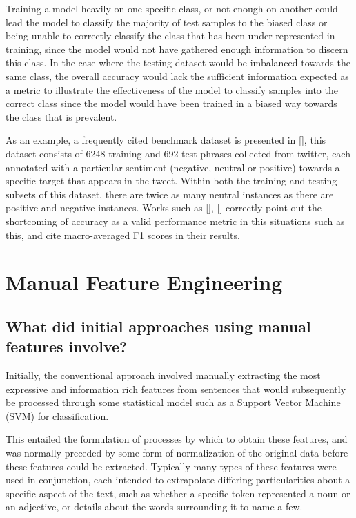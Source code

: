 \documentclass[12pt, a4paper]{report}
\theoremstyle{definition}
\theoremstyle{definition}%
\theoremstyle{definition}%
\theoremstyle{definition}%
\theoremstyle{definition}%
\theoremstyle{definition}%
\renewcommand{\cite}[1]{[\citealp{#1}]}
\begin{document}
Training a model heavily on one specific class, or not enough on another could lead the model to classify the majority of test samples to the biased class or being unable to correctly classify the class that has been under-represented in training, since the model would not have gathered enough information to discern this class. In the case where the testing dataset would be imbalanced towards the same class, the overall accuracy would lack the sufficient information expected as a metric to illustrate the effectiveness of the model to classify samples into the correct class since the model would have been trained in a biased way towards the class that is prevalent.

As an example, a frequently cited benchmark dataset is presented in \cite{dong}, this dataset consists of 6248 training and 692 test phrases collected from twitter, each annotated with a particular sentiment (negative, neutral or positive) towards a specific target that appears in the tweet. Within both the training and testing subsets of this dataset, there are twice as many neutral instances as there are positive and negative instances. Works such as \cite{chen2017}, \cite{dong} correctly point out the shortcoming of accuracy as a valid performance metric in this situations such as this, and cite macro-averaged F1 scores in their results. 

\section{Manual Feature Engineering}
\subsection{What did initial approaches using manual features involve?}
Initially, the conventional approach involved manually extracting the most expressive and information rich features from sentences that would subsequently be processed through some statistical model such as a Support Vector Machine (SVM) for classification.

This entailed the formulation of processes by which to obtain these features, and was normally preceded by some form of normalization of the original data before these features could be extracted. Typically many types of these features were used in conjunction, each intended to extrapolate differing particularities about a specific aspect of the text, such as whether a specific token represented a noun or an adjective, or details about the words surrounding it to name a few.
\end{document}

